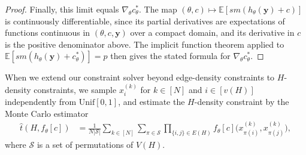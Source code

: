 \documentclass[11pt]{article}
\theoremstyle{plain}
\theoremstyle{definition}
\theoremstyle{remark}
\begin{document}
\begin{proof}
Finally, this limit equals $\nabla_\theta c^*_\theta$. The map $(\theta, c) \mapsto \mathbb{E}[\mathit{sm}(h_\theta(\mathbf{y}) + c)]$ is continuously differentiable, since its partial derivatives are expectations of functions continuous in $(\theta, c, \mathbf{y})$ over a compact domain, and its derivative in $c$ is the positive denominator above. The implicit function theorem applied to $\mathbb{E}[\mathit{sm}(h_\theta(\mathbf{y}) + c^*_\theta)] = p$ then gives the stated formula for $\nabla_\theta c^*_\theta$.
\end{proof}

When we extend our constraint solver beyond edge-density constraints to $H$-density constraints, we sample
$x_{i}^{(k)}$ for $k \in [N]$ and $i \in [v(H)]$ independently from $\mathrm{Unif}[0,1]$, and estimate the $H$-density constraint by the Monte Carlo estimator
\begin{align*}
\widehat{t}(H, f_\theta[c])
&= \frac{1}{N|\mathcal{S}|}
\sum_{k \in [N]}\sum_{\pi \in \mathcal{S}}
\prod_{\{i, j\} \in E(H)} f_\theta[c]\Big(x_{\pi(i)}^{(k)}, x_{\pi(j)}^{(k)}\Big),
\end{align*}
where $\mathcal{S}$ is a set of permutations of $V(H)$.
\end{document}
